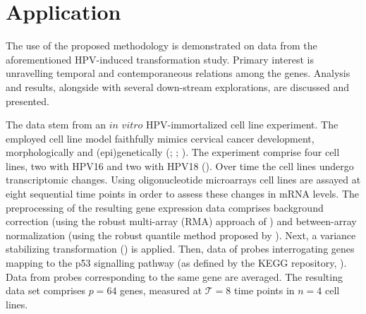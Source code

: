 \documentclass[a4paper]{article}
\date{}
\begin{document}
\section{Application}
The use of the proposed methodology is demonstrated on data from the aforementioned HPV-induced transformation study. Primary interest is unravelling temporal and contemporaneous relations among the genes. Analysis and results, alongside with several down-stream explorations, are discussed and presented.

The data stem from an $\textit{in  vitro}$ HPV-immortalized cell line experiment. The employed cell line model faithfully mimics cervical cancer development, morphologically and (epi)genetically (\cite{Steenbergen2004}; \cite{Wilting2006}; \cite{Henken2007}). The experiment comprise four cell lines, two with HPV16 and two with HPV18 (\cite{Steenbergen1996}). Over time the cell lines undergo transcriptomic changes. Using oligonucleotide microarrays cell lines are assayed at eight sequential time points in order to assess these changes in mRNA levels. The preprocessing of the resulting gene expression data comprises background correction (using the robust multi-array (RMA) approach of \cite{Irizarry2003}) and between-array normalization (using the robust quantile method proposed by \cite{Boldstad2003}). Next, a variance stabilizing transformation (\cite{Huber2002}) is applied. Then, data of probes interrogating genes mapping to the p53 signalling pathway (as defined by the KEGG repository, \cite{Kanehisa2000}). Data from probes corresponding to the same gene are averaged. The resulting data set comprises $p=64$ genes, measured at $\mathcal{T}=8$ time points in $n=4$ cell lines.
\end{document}
